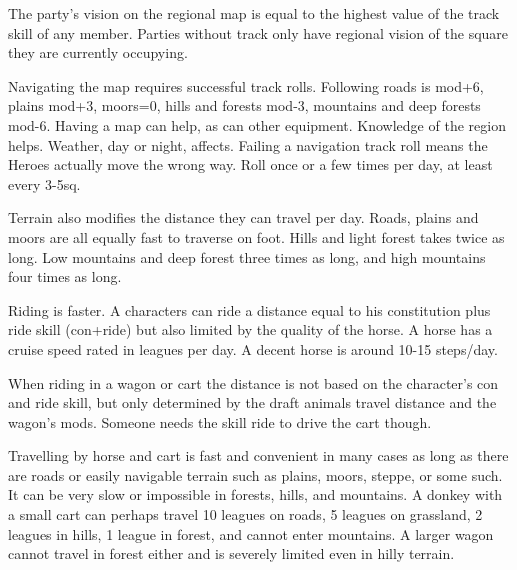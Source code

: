 The party's vision on the regional map is equal to the highest value of the track skill of any member. Parties without track only have regional vision of the square they are currently occupying.

Navigating the map requires successful track rolls. Following roads is mod+6, plains mod+3, moors=0, hills and forests mod-3, mountains and deep forests mod-6.
Having a map can help, as can other equipment. Knowledge of the region helps. Weather, day or night, affects.
Failing a navigation track roll means the Heroes actually move the wrong way. Roll once or a few times per day, at least every 3-5sq.

Terrain also modifies the distance they can travel per day. Roads, plains and moors are all equally fast to traverse on foot. Hills and light forest takes twice as long. Low mountains and deep forest three times as long, and high mountains four times as long.

Riding is faster. A characters can ride a distance equal to his constitution plus ride skill (con+ride) but also limited by the quality of the horse. A horse has a cruise speed rated in leagues per day. A decent horse is around 10-15 steps/day.

When riding in a wagon or cart the distance is not based on the character's con and ride skill, but only determined by the draft animals travel distance and the wagon's mods. Someone needs the skill ride to drive the cart though.

Travelling by horse and cart is fast and convenient in many cases as long as there are roads or easily navigable terrain such as plains, moors, steppe, or some such. It can be very slow or impossible in forests, hills, and mountains. A donkey with a small cart can perhaps travel 10 leagues on roads, 5 leagues on grassland, 2 leagues in hills, 1 league in forest, and cannot enter mountains. A larger wagon cannot travel in forest either and is severely limited even in hilly terrain.

%



